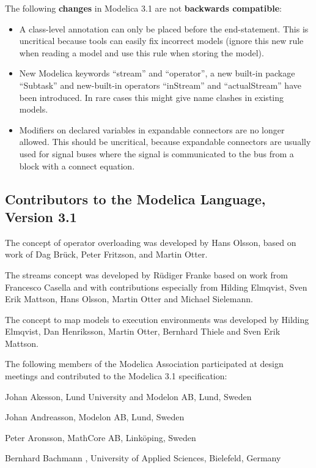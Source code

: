 \documentclass[10pt,a4paper]{report}
\def\doublelabel#1{\label{#1}\hypertarget{#1}{}}
\begin{document}
The following \textbf{changes} in Modelica 3.1 are not \textbf{backwards
compatible}:

\begin{itemize}
\item
  A class-level annotation can only be placed before the end-statement.
  This is uncritical because tools can easily fix incorrect models
  (ignore this new rule when reading a model and use this rule when
  storing the model).
\item
  New Modelica keywords ``stream'' and ``operator'', a new built-in
  package ``Subtask'' and new-built-in operators ``inStream'' and
  ``actualStream'' have been introduced. In rare cases this might give
  name clashes in existing models.
\item
  Modifiers on declared variables in expandable connectors are no longer
  allowed. This should be uncritical, because expandable connectors are
  usually used for signal buses where the signal is communicated to the
  bus from a block with a connect equation.
\end{itemize}

\subsection{Contributors to the Modelica Language, Version 3.1}\doublelabel{contributors-to-the-modelica-language-version-3-1}

The concept of operator overloading was developed by Hans Olsson, based
on work of Dag Brück, Peter Fritzson, and Martin Otter.

The streams concept was developed by Rüdiger Franke based on work from
Francesco Casella and with contributions especially from Hilding
Elmqvist, Sven Erik Mattson, Hans Olsson, Martin Otter and Michael
Sielemann.

The concept to map models to execution environments was developed by
Hilding Elmqvist, Dan Henriksson, Martin Otter, Bernhard Thiele and Sven
Erik Mattson.

The following members of the Modelica Association participated at design
meetings and contributed to the Modelica 3.1 specification:

Johan Akesson, Lund University and Modelon AB, Lund, Sweden

Johan Andreasson, Modelon AB, Lund, Sweden

Peter Aronsson, MathCore AB, Linköping, Sweden

Bernhard Bachmann , University of Applied Sciences, Bielefeld, Germany
\end{document}
